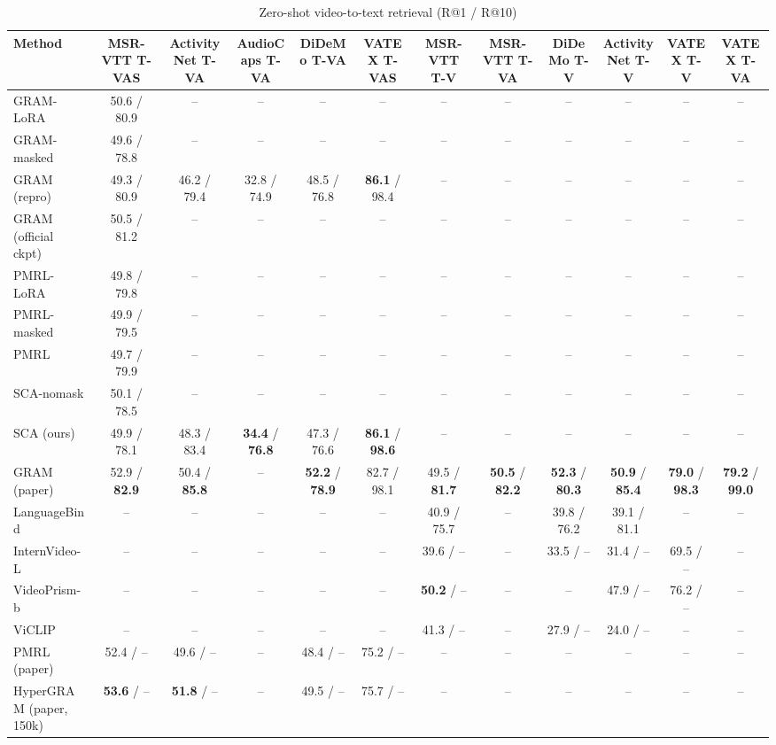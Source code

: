 \begin{table}[t]
\centering
\caption{Zero-shot video-to-text retrieval (R@1 / R@10)}
\label{tab:zeroshot_v2t}
\small
\begin{tabular}{lccccccccccc}
\toprule
Method & MSR-VTT T-VAS & ActivityNet T-VA & AudioCaps T-VA & DiDeMo T-VA & VATEX T-VAS & MSR-VTT T-V & MSR-VTT T-VA & DiDeMo T-V & ActivityNet T-V & VATEX T-V & VATEX T-VA \\
\midrule
GRAM-LoRA & 50.6 / 80.9 & -- & -- & -- & -- & -- & -- & -- & -- & -- & -- \\
GRAM-masked & 49.6 / 78.8 & -- & -- & -- & -- & -- & -- & -- & -- & -- & -- \\
GRAM (repro) & 49.3 / 80.9 & 46.2 / 79.4 & 32.8 / 74.9 & 48.5 / 76.8 & \textbf{86.1} / 98.4 & -- & -- & -- & -- & -- & -- \\
GRAM (official ckpt) & 50.5 / 81.2 & -- & -- & -- & -- & -- & -- & -- & -- & -- & -- \\
PMRL-LoRA & 49.8 / 79.8 & -- & -- & -- & -- & -- & -- & -- & -- & -- & -- \\
PMRL-masked & 49.9 / 79.5 & -- & -- & -- & -- & -- & -- & -- & -- & -- & -- \\
PMRL & 49.7 / 79.9 & -- & -- & -- & -- & -- & -- & -- & -- & -- & -- \\
SCA-nomask & 50.1 / 78.5 & -- & -- & -- & -- & -- & -- & -- & -- & -- & -- \\
SCA (ours) & 49.9 / 78.1 & 48.3 / 83.4 & \textbf{34.4} / \textbf{76.8} & 47.3 / 76.6 & \textbf{86.1} / \textbf{98.6} & -- & -- & -- & -- & -- & -- \\
GRAM (paper) & 52.9 / \textbf{82.9} & 50.4 / \textbf{85.8} & -- & \textbf{52.2} / \textbf{78.9} & 82.7 / 98.1 & 49.5 / \textbf{81.7} & \textbf{50.5} / \textbf{82.2} & \textbf{52.3} / \textbf{80.3} & \textbf{50.9} / \textbf{85.4} & \textbf{79.0} / \textbf{98.3} & \textbf{79.2} / \textbf{99.0} \\
LanguageBind & -- & -- & -- & -- & -- & 40.9 / 75.7 & -- & 39.8 / 76.2 & 39.1 / 81.1 & -- & -- \\
InternVideo-L & -- & -- & -- & -- & -- & 39.6 / -- & -- & 33.5 / -- & 31.4 / -- & 69.5 / -- & -- \\
VideoPrism-b & -- & -- & -- & -- & -- & \textbf{50.2} / -- & -- & -- & 47.9 / -- & 76.2 / -- & -- \\
ViCLIP & -- & -- & -- & -- & -- & 41.3 / -- & -- & 27.9 / -- & 24.0 / -- & -- & -- \\
PMRL (paper) & 52.4 / -- & 49.6 / -- & -- & 48.4 / -- & 75.2 / -- & -- & -- & -- & -- & -- & -- \\
HyperGRAM (paper, 150k) & \textbf{53.6} / -- & \textbf{51.8} / -- & -- & 49.5 / -- & 75.7 / -- & -- & -- & -- & -- & -- & -- \\
\bottomrule
\end{tabular}
\end{table}
